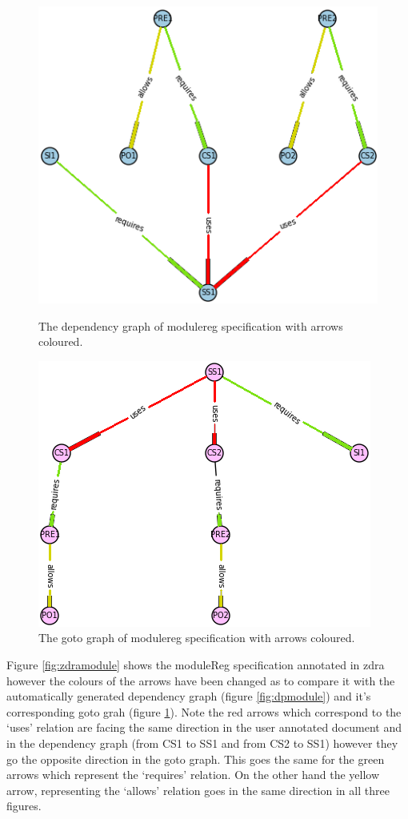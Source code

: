 \begin{figure}[H]
\centering
\begin{minipage}{0.47\textwidth}
\centering
\includegraphics[scale=0.55]{Figures/Formalising/dpmodule.png}
\caption{The dependency graph of modulereg specification with arrows coloured.  \label{fig:dpmodule}}
\end{minipage}\hfill
\begin{minipage}{0.47\textwidth}
\centering
\includegraphics[scale=0.55]{Figures/Formalising/gotomodule.png}
\caption{The goto graph of modulereg specification with arrows coloured. \label{fig:gotomodule}}
\end{minipage}
\end{figure}

Figure \ref{fig:zdramodule} shows the moduleReg specification annotated in
\gls{zdra} however the colours of the arrows have been changed as to compare it
with the automatically generated dependency graph (figure \ref{fig:dpmodule})
and it's corresponding goto grah (figure \ref{fig:gotomodule}). Note the red
arrows which correspond to the `uses' relation are facing the same direction in
the user annotated document and in the dependency graph (from CS1 to SS1 and
from CS2 to SS1) however they go the opposite direction in the goto graph. This
goes the same for the green arrows which represent the `requires' relation. On
the other hand the yellow arrow, representing the `allows' relation goes in the
same direction in all three figures.

